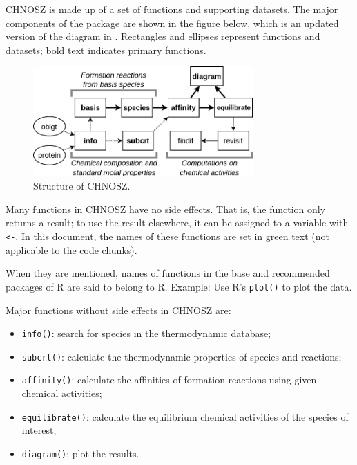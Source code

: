 \documentclass[]{tufte-book}
\providecommand{\tightlist}{%
  \setlength{\itemsep}{0pt}\setlength{\parskip}{0pt}}
\begin{document}
CHNOSZ is made up of a set of functions and supporting datasets. The
major components of the package are shown in the figure below, which is
an updated version of the diagram in \citet{Dic08}. Rectangles and
ellipses represent functions and datasets; bold text indicates primary
functions.

\begin{figure}
\centering
\includegraphics[width=0.75000\textwidth]{CHNOSZ.png}
\caption{Structure of CHNOSZ.}
\end{figure}

Many functions in CHNOSZ have no side effects. That is, the function
only returns a result; to use the result elsewhere, it can be assigned
to a variable with \texttt{\textless{}-}. In this document, the names of
these functions are set in {green text} (not applicable to the code
chunks).

\begin{marginfigure}
When they are mentioned, names of functions in the base and recommended
packages of R are said to belong to R. Example: Use R's \texttt{plot()}
to plot the data.
\end{marginfigure}

Major functions without side effects in CHNOSZ are:

\begin{itemize}
\tightlist
\item
  {\texttt{info()}}: search for species in the thermodynamic database;
\item
  {\texttt{subcrt()}}: calculate the thermodynamic properties of species
  and reactions;
\item
  {\texttt{affinity()}}: calculate the affinities of formation reactions
  using given chemical activities;
\item
  {\texttt{equilibrate()}}: calculate the equilibrium chemical
  activities of the species of interest;
\item
  {\texttt{diagram()}}: plot the results.
\end{itemize}
\end{document}
